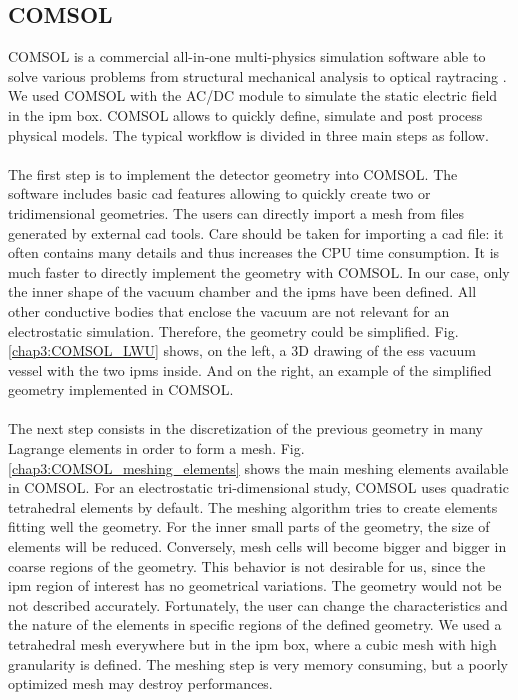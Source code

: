 \begin{refsection}

  \subsection{COMSOL}
  COMSOL is a commercial all-in-one multi-physics simulation software able to solve various problems from structural mechanical analysis to optical raytracing \cite{comsol2018}. We used COMSOL with the AC/DC module \cite{comsolacdc2018} to simulate the static electric field in the \acrshort{ipm} box. COMSOL allows to quickly define, simulate and post process physical models. The typical workflow is divided in three main steps as follow.

  \paragraph{}
  The first step is to implement the detector geometry into COMSOL. The software includes basic \acrshort{cad} features allowing to quickly create two or tridimensional geometries. The users can directly import a mesh from files generated by external \acrshort{cad} tools. Care should be taken for importing a \acrshort{cad} file: it often contains many details and thus increases the CPU time consumption. It is much faster to directly implement the geometry with COMSOL.  In our case, only the inner shape of the vacuum chamber and the \acrshort{ipm}s have been defined. All other conductive bodies that enclose the vacuum are not relevant for an electrostatic simulation. Therefore, the geometry could be simplified. Fig. \ref{chap3:COMSOL_LWU} shows, on the left, a 3D drawing of the \acrshort{ess} vacuum vessel with the two \acrshort{ipm}s inside. And on the right, an example of the simplified geometry implemented in COMSOL.

  

  \paragraph{}
  The next step consists in the discretization of the previous geometry in many Lagrange elements in order to form a mesh. Fig. \ref{chap3:COMSOL_meshing_elements} shows the main meshing elements available in COMSOL. For an electrostatic tri-dimensional study, COMSOL uses quadratic tetrahedral elements by default. The meshing algorithm tries to create elements fitting well the geometry. For the inner small parts of the geometry, the size of elements will be reduced. Conversely, mesh cells will become bigger and bigger in coarse regions of the geometry. This behavior is not desirable for us, since the \acrshort{ipm} region of interest has no geometrical variations. The geometry would not be not described accurately. Fortunately, the user can change the characteristics and the nature of the elements in specific regions of the defined geometry. We used a tetrahedral mesh everywhere but in the \acrshort{ipm} box, where a cubic mesh with high granularity is defined. The meshing step is very memory consuming, but a poorly optimized mesh may destroy performances.


\end{refsection}
